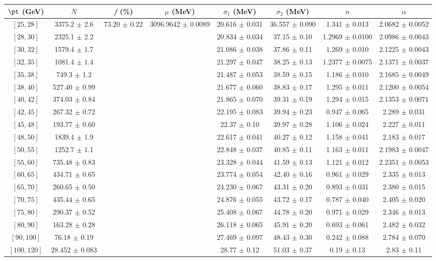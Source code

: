 \begin{tabular}{c||c|c|c|c|c|c|c}
$\pt$ (GeV) & $N$ & $f$ (\%) & $\mu$ (MeV) & $\sigma_1$ (MeV) & $\sigma_2$ (MeV) & $n$ & $\alpha$ \\
\hline
$[25, 28]$ & 3375.2 $\pm$ 2.6 & \multirow{19}{*}{73.20 $\pm$ 0.22} & \multirow{19}{*}{3096.9642 $\pm$ 0.0089} & 20.616 $\pm$ 0.031 & 36.557 $\pm$ 0.090 & 1.341 $\pm$ 0.013 & 2.0682 $\pm$ 0.0052\\
$[28, 30]$ & 2325.1 $\pm$ 2.2 &  &  & 20.834 $\pm$ 0.034 & 37.15 $\pm$ 0.10 & 1.2969 $\pm$ 0.0100 & 2.0986 $\pm$ 0.0043\\
$[30, 32]$ & 1579.4 $\pm$ 1.7 &  &  & 21.086 $\pm$ 0.038 & 37.86 $\pm$ 0.11 & 1.269 $\pm$ 0.010 & 2.1225 $\pm$ 0.0043\\
$[32, 35]$ & 1081.4 $\pm$ 1.4 &  &  & 21.297 $\pm$ 0.047 & 38.25 $\pm$ 0.13 & 1.2377 $\pm$ 0.0075 & 2.1371 $\pm$ 0.0037\\
$[35, 38]$ & 749.3 $\pm$ 1.2 &  &  & 21.487 $\pm$ 0.053 & 38.59 $\pm$ 0.15 & 1.186 $\pm$ 0.010 & 2.1685 $\pm$ 0.0049\\
$[38, 40]$ & 527.40 $\pm$ 0.99 &  &  & 21.677 $\pm$ 0.060 & 38.83 $\pm$ 0.17 & 1.295 $\pm$ 0.011 & 2.1200 $\pm$ 0.0054\\
$[40, 42]$ & 374.03 $\pm$ 0.84 &  &  & 21.865 $\pm$ 0.070 & 39.31 $\pm$ 0.19 & 1.294 $\pm$ 0.015 & 2.1353 $\pm$ 0.0071\\
$[42, 45]$ & 267.32 $\pm$ 0.72 &  &  & 22.195 $\pm$ 0.083 & 39.94 $\pm$ 0.23 & 0.947 $\pm$ 0.065 & 2.289 $\pm$ 0.031\\
$[45, 48]$ & 193.77 $\pm$ 0.60 &  &  & 22.37 $\pm$ 0.10 & 39.97 $\pm$ 0.28 & 1.106 $\pm$ 0.024 & 2.227 $\pm$ 0.011\\
$[48, 50]$ & 1839.4 $\pm$ 1.9 &  &  & 22.617 $\pm$ 0.041 & 40.27 $\pm$ 0.12 & 1.158 $\pm$ 0.041 & 2.183 $\pm$ 0.017\\
$[50, 55]$ & 1252.7 $\pm$ 1.1 &  &  & 22.848 $\pm$ 0.037 & 40.85 $\pm$ 0.11 & 1.163 $\pm$ 0.011 & 2.1983 $\pm$ 0.0047\\
$[55, 60]$ & 735.48 $\pm$ 0.83 &  &  & 23.328 $\pm$ 0.044 & 41.59 $\pm$ 0.13 & 1.121 $\pm$ 0.012 & 2.2351 $\pm$ 0.0053\\
$[60, 65]$ & 434.71 $\pm$ 0.65 &  &  & 23.774 $\pm$ 0.054 & 42.40 $\pm$ 0.16 & 0.961 $\pm$ 0.029 & 2.335 $\pm$ 0.013\\
$[65, 70]$ & 260.65 $\pm$ 0.50 &  &  & 24.230 $\pm$ 0.067 & 43.31 $\pm$ 0.20 & 0.893 $\pm$ 0.031 & 2.380 $\pm$ 0.015\\
$[70, 75]$ & 435.44 $\pm$ 0.65 &  &  & 24.876 $\pm$ 0.055 & 43.72 $\pm$ 0.17 & 0.787 $\pm$ 0.040 & 2.405 $\pm$ 0.020\\
$[75, 80]$ & 290.37 $\pm$ 0.52 &  &  & 25.408 $\pm$ 0.067 & 44.78 $\pm$ 0.20 & 0.971 $\pm$ 0.029 & 2.346 $\pm$ 0.013\\
$[80, 90]$ & 163.28 $\pm$ 0.28 &  &  & 26.118 $\pm$ 0.065 & 45.91 $\pm$ 0.20 & 0.693 $\pm$ 0.061 & 2.482 $\pm$ 0.032\\
$[90, 100]$ & 76.18 $\pm$ 0.19 &  &  & 27.469 $\pm$ 0.097 & 48.43 $\pm$ 0.30 & 0.242 $\pm$ 0.088 & 2.784 $\pm$ 0.070\\
$[100, 120]$ & 28.452 $\pm$ 0.083 &  &  & 28.77 $\pm$ 0.12 & 51.03 $\pm$ 0.37 & 0.19 $\pm$ 0.13 & 2.83 $\pm$ 0.11\\
\end{tabular}
